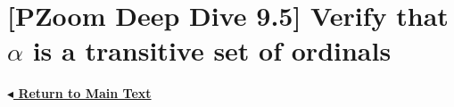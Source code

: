 \documentclass[11pt]{article}
\begin{document}
\pagestyle{empty} %

\section*{[PZoom Deep Dive 9.5] Verify that $\alpha$ is a transitive set of ordinals}

\vspace{0.8cm}
\noindent
\href{\pzbaseUrl/assets/pdfs/entry-0009/entry-0009-ordinals-part-i.pdf#body:entry-0009-5}{\textbf{\ensuremath{\blacktriangleleft} Return to Main Text}}
\end{document}

